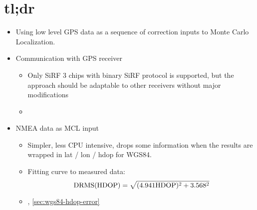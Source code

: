 \chapter{tl;dr}

\begin{itemize}
\item
Using low level GPS data as a sequence of correction inputs to Monte Carlo Localization.

\item
Communication with GPS receiver
\begin{itemize}
    \item Only SiRF 3 chips with binary SiRF protocol is supported, but the
    approach should be adaptable to other receivers without major modifications
    \item {}
\end{itemize}

\item
NMEA data as MCL input
\begin{itemize}
    \item Simpler, less CPU intensive, drops some information when the results are
    wrapped in lat / lon / hdop for WGS84.
    \item
        Fitting curve to measured data:
        \begin{equation*}
            \mathrm{DRMS}(\mathrm{HDOP}) = \sqrt{(\num{4.941}\mathrm{HDOP})^2 + \num{3.568}^2}
        \end{equation*}
    \item {}, \cref{sec:wgs84-hdop-error}
\end{itemize}

\end{itemize}
